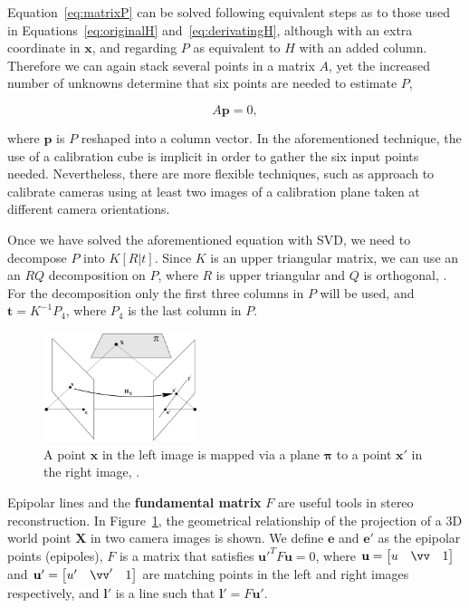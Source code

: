 \documentclass[12pt]{article}
\begin{document}
Equation~\ref{eq:matrixP} can be solved following equivalent steps as to those used in Equations~\ref{eq:originalH} and~\ref{eq:derivatingH}, although with an extra coordinate in $\mathbf{x}$, and regarding $P$ as equivalent to $H$ with an added column.
Therefore we can again stack several points in a matrix $A$, yet the increased number of unknowns determine that six points are needed to estimate $P$,

\begin{equation}
A\mathbf{p} = 0,
\end{equation}

where $\mathbf{p}$ is $P$ reshaped into a column vector.
In the aforementioned technique, the use of a calibration cube is implicit in order to gather the six input points needed.
Nevertheless, there are more flexible techniques, such as \cite{Zhang2000} approach to calibrate cameras using at least two images of a calibration plane taken at different camera orientations.

Once we have solved the aforementioned equation with SVD, we need to decompose $P$ into $K[R|t]$.
Since $K$ is an upper triangular matrix, we can use an an $RQ$ decomposition on $P$, where $R$ is upper triangular and $Q$ is orthogonal, \cite{Francis1961}.
For the decomposition only the first three columns in $P$ will be used, and $\mathbf{t} = K^{-1}P_4$, where $P_4$ is the last column in $P$.


\begin{figure}[htbp!]
	\centering
	\includegraphics[width=0.4\textwidth]{images/epipolarLines}
	\caption{A point $\mathbf{x}$ in the left image is mapped via a plane $\boldsymbol{\pi}$ to a point $\mathbf{x}'$ in the right image, \cite{Hartley2004}.}\label{fig:epipolarLines}
\end{figure}

Epipolar lines and the \textbf{fundamental matrix} $F$ are useful tools in stereo reconstruction.
In Figure~\ref{fig:epipolarLines}, the geometrical relationship of the projection of a 3D world point $\mathbf{X}$ in two camera images is shown.
We define $\mathbf{e}$ and $\mathbf{e}'$ as the epipolar points (epipoles), $F$ is a matrix that satisfies $\mathbf{u}'^TF\mathbf{u} = 0$, where $\mathbf{u} = \begin{bmatrix} u & \vv & 1 \end{bmatrix}$ and $\mathbf{u}' = \begin{bmatrix} u' & \vv' & 1 \end{bmatrix}$ are matching points in the left and right images respectively, and $\mathbf{l}'$ is a line such that $\mathbf{l}' = F\mathbf{u}'$.
\end{document}
